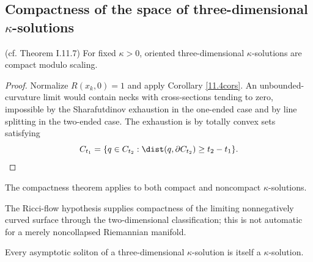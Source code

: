 \subsection{Compactness of the space of three-dimensional $\kappa$-solutions}
\label{pf11.7}
\begin{theorem}
\label{thm:kl-compactness-space-three-dimensional-solutions-compactness-kappa-solutions}

(cf. Theorem I.11.7) \label{thmI.11.7}
For fixed $\kappa>0$, oriented three-dimensional $\kappa$-solutions are
compact modulo scaling.
\end{theorem}
\begin{proof}
\sketch Normalize $R(x_k,0)=1$ and apply Corollary \ref{11.4cors}.  An
unbounded-curvature limit would contain necks with cross-sections tending to
zero, impossible by the Sharafutdinov exhaustion in the one-ended case and
by line splitting in the two-ended case.  The exhaustion is by totally convex
sets satisfying
\begin{equation}\label{C}
C_{t_1}=\{q\in C_{t_2}:\dist(q,\partial C_{t_2})\geq t_2-t_1\}.
\end{equation}
\end{proof}
\begin{remark}
\label{rem:kl-compactness-space-three-dimensional-solutions-compactness-kappa-solutions}

The compactness theorem applies to both compact and noncompact
$\kappa$-solutions.
\end{remark}
\begin{remark}
\label{rem:kl-compactness-space-three-dimensional-solutions-compactness-kappa-solutions-3}


The Ricci-flow hypothesis supplies compactness of the limiting
nonnegatively curved surface through the two-dimensional classification;
this is not automatic for a merely noncollapsed Riemannian manifold.
\end{remark}
\begin{corollary}
\label{cor:kl-compactness-space-three-dimensional-solutions-kappa-solutions-corollary}

Every asymptotic soliton of a three-dimensional $\kappa$-solution is itself
a $\kappa$-solution.
\end{corollary}

